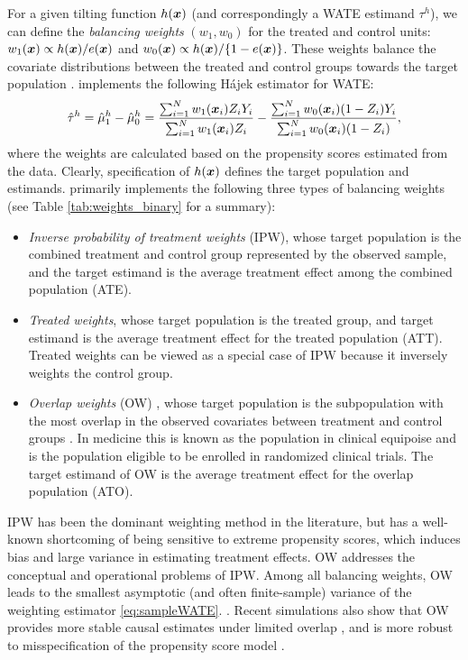  
For a given tilting function $h(\bm{x})$ (and correspondingly a WATE estimand $\tau^h$), we can define the \emph{balancing weights} $(w_1,w_0)$ for the treated and control units:  $w_1(\bm{x}) \propto h(\bm{x})/{e(\bm{x})}$ and $w_0(\bm{x}) 
\propto h(\bm{x})/\{1-e(\bm{x})\}$. These weights balance the covariate distributions between the treated and control groups towards the target population \citep{LiMorganZaslavsky2018}.  implements the following H\'{a}jek estimator for WATE:
\begin{equation}
\label{eq:sampleWATE}
\hat{\tau}^h=\hat{\mu}^h_1-\hat{\mu}^h_0=\frac{\sum_{i=1}^N w_1(\bm{x}_i)Z_i Y_i}{\sum_{i=1}^N w_1(\bm{x}_i)Z_i} -
              \frac{\sum_{i=1}^N w_0(\bm{x}_i)(1-Z_i) Y_i}{\sum_{i=1}^N w_0(\bm{x}_i)(1-Z_i)},
\end{equation}
where the weights are calculated based on the propensity scores estimated from the data. Clearly, specification of $h(\bm{x})$ defines the target population and estimands.  primarily implements the following three types of balancing weights (see Table \ref{tab:weights_binary} for a summary):
\begin{itemize}
    \item \emph{Inverse probability of treatment weights} (IPW), whose target population is  the combined treatment and control group represented by the observed sample, and the target estimand is the average treatment effect among the combined population (ATE).
    \item \emph{Treated weights}, whose target population is the treated group, and target estimand is the average treatment effect for the treated population (ATT). Treated weights can be viewed as a special case of IPW because it inversely weights the control group. 
    \item \emph{Overlap weights} (OW) \citep{LiMorganZaslavsky2018, li2019propensity}, whose target population is the subpopulation with the most overlap in the observed covariates between treatment and control groups . In medicine  this is known as the population in clinical equipoise and is the population eligible to be enrolled in randomized clinical trials.
    The target estimand of OW is the average treatment effect for the overlap population (ATO).
 
\end{itemize}
IPW has been the dominant weighting method in the literature, but has a well-known shortcoming of being sensitive to extreme propensity scores, which induces bias and large variance in estimating treatment effects. OW addresses the conceptual and operational problems of IPW.   
Among all balancing weights, OW leads to the smallest asymptotic (and often finite-sample) variance of the weighting estimator \eqref{eq:sampleWATE}.  \citep{LiMorganZaslavsky2018,LiThomasLi2018}.  
Recent simulations also show that OW provides more stable causal estimates under limited overlap \citep{LiThomasLi2018,Mao2018,Yoshida2017,Yoshida2019}, and is more robust to misspecification of the propensity score model \citep{Zhou2020}. 

